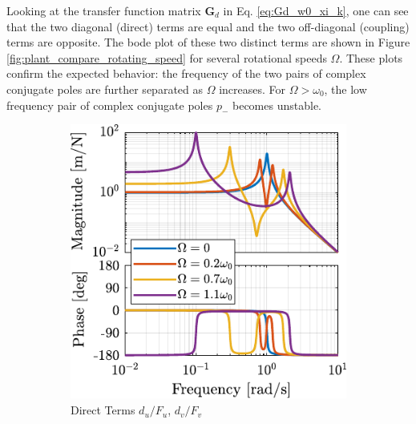 \documentclass{ISMA_USD2020}
\begin{document}
Looking at the transfer function matrix \(\bm{G}_d\) in Eq. \eqref{eq:Gd_w0_xi_k}, one can see that the two diagonal (direct) terms are equal and the two off-diagonal (coupling) terms are opposite.
The bode plot of these two distinct terms are shown in Figure \ref{fig:plant_compare_rotating_speed} for several rotational speeds \(\Omega\).
These plots confirm the expected behavior: the frequency of the two pairs of complex conjugate poles are further separated as \(\Omega\) increases.
For \(\Omega > \omega_0\), the low frequency pair of complex conjugate poles \(p_{-}\) becomes unstable.

\begin{figure}[htbp]
\begin{subfigure}[c]{0.45\linewidth}
\includegraphics[width=\linewidth]{figs/plant_compare_rotating_speed_direct.pdf}
\caption{\label{fig:plant_compare_rotating_speed_direct} Direct Terms \(d_u/F_u\), \(d_v/F_v\)}
\end{subfigure}
\hfill
\begin{subfigure}[c]{0.45\linewidth}

\end{subfigure}
\end{figure}
\end{document}
